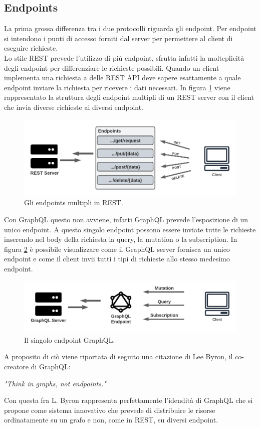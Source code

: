 \subsection{Endpoints}
La prima grossa differenza tra i due protocolli riguarda gli endpoint. Per endpoint si intendono i punti di accesso forniti dal server per permettere al client di eseguire richieste.\\
Lo stile REST prevede l'utilizzo di più endpoint, sfrutta infatti la molteplicità degli endpoint per differenziare le richieste possibili. Quando un client implementa una richiesta a delle REST API deve sapere esattamente a quale endpoint inviare la richiesta per ricevere i dati necessari. In figura \ref{REST-endpoints} viene rappresentato la struttura degli endpoint multipli di un REST server con il client che invia diverse richieste ai diversi endpoint.
\FloatBarrier
\begin{figure}[!ht]
\centering
\includegraphics[width=1\linewidth]{immagini/RESTEndpoints.pdf}
\caption{Gli endpoints multipli in REST.}
\label{REST-endpoints}
\end{figure}
\FloatBarrier
Con GraphQL questo non avviene, infatti GraphQL prevede l'esposizione di un unico endpoint. A questo singolo endpoint possono essere inviate tutte le richieste inserendo nel body della richiesta la query, la mutation o la subscription. In figura \ref{GraphQL-endpoint} è possibile visualizzare come il GraphQL server fornisca un unico endpoint e come il client invii tutti i tipi di richieste allo stesso medesimo endpoint.
\FloatBarrier
\begin{figure}[!ht]
\centering
\includegraphics[width=1\linewidth]{immagini/GraphQLEndpoint.pdf}
\caption{Il singolo endpoint GraphQL.}
\label{GraphQL-endpoint}
\end{figure}
\FloatBarrier
A proposito di ciò viene riportata di seguito una citazione di Lee Byron, il co-creatore di GraphQL:
\begin{quoting}
  \textit{"Think in graphs, not endpoints."}
\end{quoting}
Con questa fra L. Byron rappresenta perfettamente l'idendità di GraphQL che si propone come sistema innovativo che prevede di distribuire le risorse ordinatamente su un grafo e non, come in REST, su diversi endpoint.

